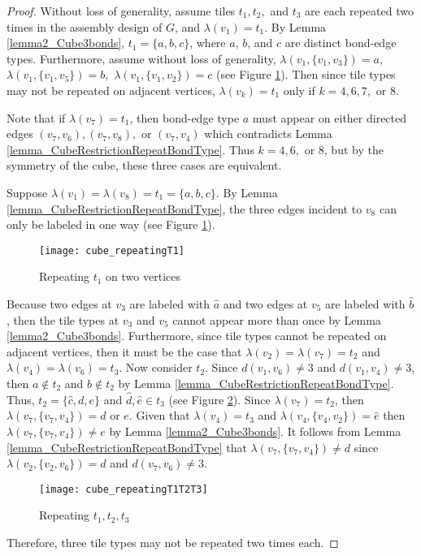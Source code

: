 \documentclass{elsarticle}
\theoremstyle{definition}
\theoremstyle{remark}
\theoremstyle{plain}
\theoremstyle{plain}
\begin{document}
\begin{proof}
  Without loss of generality, assume tiles $t_1, t_2,$ and $t_3$ are each repeated two times in the assembly design of $G$, and $\lambda(v_1) = t_1$.  By Lemma \ref{lemma2_Cube3bonds}, $t_1 = \{a, b, c\}$, where $a$, $b$, and $c$ are distinct bond-edge types. Furthermore, assume without loss of generality, $\lambda(v_1,\{v_1,v_3\}) = a,$     $\lambda(v_1,\{v_1,v_5\})=b,$  $\lambda(v_1,\{v_1,v_2\})= c$ (see Figure \ref{fig:CubeRepeat_t1}).  Then since tile types may not be repeated on adjacent vertices, $\lambda(v_k) = t_1$ only if $k = 4, 6, 7,$ or 8. 
 
 
 Note that if $\lambda(v_7) = t_1$, then bond-edge type $a$ must appear on either directed edges $(v_7,v_6), (v_7,v_8),$ or $(v_7,v_4)$ which contradicts Lemma \ref{lemma_CubeRestrictionRepeatBondType}. Thus $k = 4, 6,$ or $8$, but by the symmetry of the cube, these three cases are equivalent.

 
 Suppose $\lambda(v_1) = \lambda(v_8) = t_1 = \{a, b, c\}$. By Lemma \ref{lemma_CubeRestrictionRepeatBondType}, the three edges incident to $v_8$ can only be labeled in one way (see Figure \ref{fig:CubeRepeat_t1}). 
 
 \begin{figure}[h]
     \centering
     \texttt{[image: cube\_repeatingT1]}
     \caption{Repeating $t_1$ on two vertices}
     \label{fig:CubeRepeat_t1}
 \end{figure}
 
 Because two edges at $v_3$ are labeled with $\hat{a}$ and two edges at $v_5$ are labeled with $\hat{b}$, then the tile types at $v_3$ and $v_5$ cannot appear more than once by Lemma \ref{lemma2_Cube3bonds}. Furthermore, since tile types cannot be repeated on adjacent vertices, then it must be the case that $\lambda(v_2) = \lambda(v_7) = t_2$ and $\lambda(v_4)=\lambda(v_6) = t_3$. Now consider $t_2$. Since $d(v_1,v_6) \neq 3$ and $d(v_1,v_4) \neq 3$, then $a \notin t_2$ and $b \notin t_2$ by Lemma \ref{lemma_CubeRestrictionRepeatBondType}. Thus, $t_2 = \{\hat{c}, d, e\}$ and $\hat{d}, \hat{e} \in t_3$ (see Figure \ref{fig:CubeRepeat_t1_t2}). Since $\lambda(v_7)= t_2$, then $\lambda(v_7,\{v_7,v_4\}) = d$ or $e$. Given that $\lambda(v_4) = t_3$ and $\lambda(v_4,\{v_4,v_2\})=\hat{e}$ then $\lambda(v_7,\{v_7,v_4\}) \neq e$ by Lemma \ref{lemma2_Cube3bonds}.  It follows from Lemma \ref{lemma_CubeRestrictionRepeatBondType} that $\lambda(v_7,\{v_7,v_4\}) \neq d$ since $\lambda(v_2,\{v_2,v_6\}) = d$ and $d(v_7,v_6) \neq 3$. 
  
 \begin{figure}[h]
     \centering
    \texttt{[image: cube\_repeatingT1T2T3]}
    \caption{Repeating $t_1, t_2, t_3$}
     \label{fig:CubeRepeat_t1_t2}
 \end{figure}
 
 Therefore, three tile types may not be repeated two times each.
\end{proof}
\end{document}
